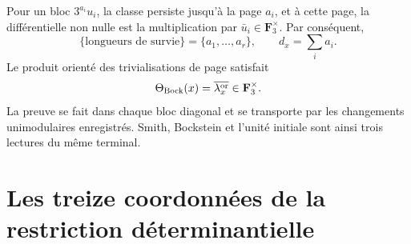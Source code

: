 Pour un bloc \(3^{a_i}u_i\), la classe persiste jusqu'à la page \(a_i\),
et à cette page, la différentielle non nulle est la multiplication par
\(\bar u_i\in\mathbf F_3^\times\). Par conséquent,
\begin{equation}\label{eq:detint-bock-longitudes}
 \{\text{longueurs de survie}\}=\{a_1,\ldots,a_r\},
 \qquad
 d_x=\sum_i a_i.
\end{equation}
Le produit orienté des trivialisations de page satisfait
\begin{equation}\label{eq:detint-bock-leading}
 \Theta_{\rm Bock}(x)=\overline{\lambda_x^{\rm or}}
 \in\mathbf F_3^\times.
\end{equation}
La preuve se fait dans chaque bloc diagonal et se transporte par les changements
unimodulaires enregistrés. Smith, Bockstein et l'unité initiale sont ainsi trois
lectures du même terminal.

\iffalse
\section{Les treize coordonnées de la restriction déterminantielle}

